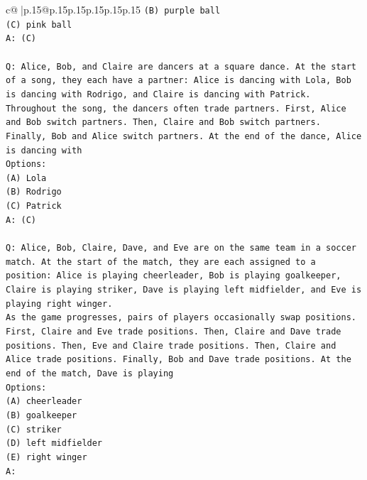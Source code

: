 \documentclass{article}
\begin{document}
{\begin{supertabular}{c@{$\;$}|p{.15\linewidth}@{}p{.15\linewidth}p{.15\linewidth}p{.15\linewidth}p{.15\linewidth}p{.15\linewidth}}
{{{\texttt{(B) purple ball} \\
\texttt{(C) pink ball} \\
\texttt{A: (C)} \\
\\ 
\texttt{Q: Alice, Bob, and Claire are dancers at a square dance. At the start of a song, they each have a partner: Alice is dancing with Lola, Bob is dancing with Rodrigo, and Claire is dancing with Patrick.} \\
\texttt{Throughout the song, the dancers often trade partners. First, Alice and Bob switch partners. Then, Claire and Bob switch partners. Finally, Bob and Alice switch partners. At the end of the dance, Alice is dancing with} \\
\texttt{Options:} \\
\texttt{(A) Lola} \\
\texttt{(B) Rodrigo} \\
\texttt{(C) Patrick} \\
\texttt{A: (C)} \\
\\ 
\texttt{Q: Alice, Bob, Claire, Dave, and Eve are on the same team in a soccer match. At the start of the match, they are each assigned to a position: Alice is playing cheerleader, Bob is playing goalkeeper, Claire is playing striker, Dave is playing left midfielder, and Eve is playing right winger.} \\
\texttt{As the game progresses, pairs of players occasionally swap positions. First, Claire and Eve trade positions. Then, Claire and Dave trade positions. Then, Eve and Claire trade positions. Then, Claire and Alice trade positions. Finally, Bob and Dave trade positions. At the end of the match, Dave is playing} \\
\texttt{Options:} \\
\texttt{(A) cheerleader} \\
\texttt{(B) goalkeeper} \\
\texttt{(C) striker} \\
\texttt{(D) left midfielder} \\
\texttt{(E) right winger} \\
\texttt{A:} \\
            }
        }
    }
     \\ \\


\end{supertabular}}
\end{document}
